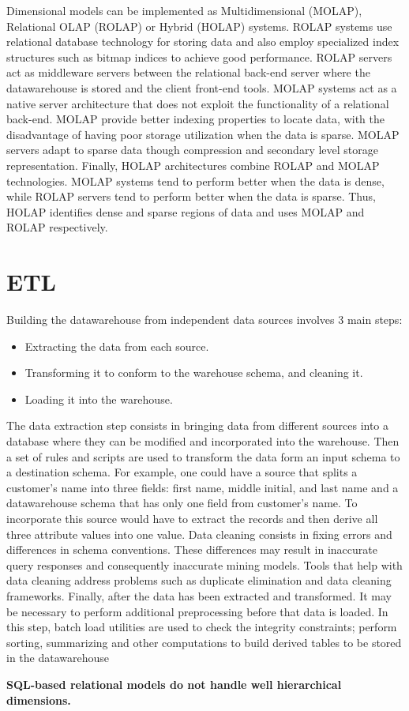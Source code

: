 \documentclass[]{article}
\begin{document}
Dimensional models can be implemented as Multidimensional (MOLAP), Relational OLAP (ROLAP) or Hybrid (HOLAP) systems. ROLAP systems use
relational database technology for storing data and also employ specialized index structures such as bitmap indices to achieve good
performance. ROLAP servers act as middleware servers between the relational back-end server where the datawarehouse is stored and the
client front-end tools. MOLAP systems act as a native server architecture that does not exploit the functionality of a relational
back-end. MOLAP provide better indexing properties to locate data, with the disadvantage of having poor storage utilization when the
data is sparse. MOLAP servers adapt to sparse data though compression and secondary level storage representation. Finally, HOLAP
architectures combine ROLAP and MOLAP technologies. MOLAP systems tend to perform better when the data is dense, while ROLAP servers
tend to perform better when the data is sparse. Thus, HOLAP identifies dense and sparse regions of data and uses MOLAP and ROLAP
respectively.


\section{ETL} %
\label{sec:etl}
Building the datawarehouse from independent data sources involves 3 main steps:
\begin{itemize}
	\item Extracting the data from each source.
	\item Transforming it to conform to the warehouse schema, and cleaning it.
	\item Loading it into the warehouse.
\end{itemize}

The data extraction step consists in bringing data from different sources into a database where they can be modified and incorporated
into the warehouse. Then a set of rules and scripts are used to transform the data form an input schema to a destination schema. For
example, one could have a source that splits a customer's name into three fields: first name, middle initial, and last name and a
datawarehouse schema that has only one field from customer's name. To incorporate this source would have to extract the records and then
derive all three attribute values into one value.
Data cleaning consists in fixing errors and differences in schema conventions. These differences may result in inaccurate query
responses and consequently inaccurate mining models. Tools that help with data cleaning address problems such as duplicate elimination
and data cleaning frameworks.
Finally, after the data has been extracted and transformed. It may be necessary to perform additional preprocessing before that data is
loaded. In this step, batch load utilities are used to check the integrity constraints; perform sorting, summarizing and other
computations to build derived tables to be stored in the datawarehouse


\textbf{SQL-based
relational models do not handle well hierarchical dimensions.}




\end{document}
